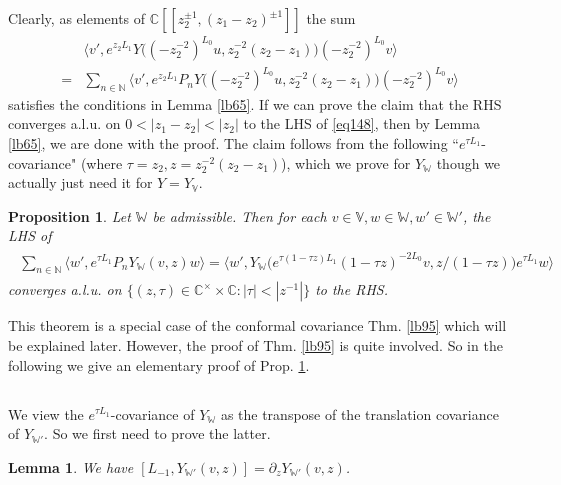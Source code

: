 \documentclass[11pt,b5paper,notitlepage]{article}
\theoremstyle{definition}
\theoremstyle{plain}
\newtheorem{pp}[df]{Proposition}
\newtheorem{lm}[df]{Lemma}
\newcommand{\bigbk}[1]{\big\langle {#1}\big\rangle}
\newcommand{\Vbb}{\mathbb V}
\newcommand{\Wbb}{\mathbb W}
\newcommand{\Cbb}{\mathbb C}
\newcommand{\Nbb}{\mathbb N}
\numberwithin{equation}{section}
\begin{document}
Clearly, as elements of $\Cbb[[z_2^{\pm1},(z_1-z_2)^{\pm1}]]$ the sum
\begin{align}
&\bigbk{v',e^{z_2L_1}Y\big((-z_2^{-2})^{L_0}u,z_2^{-2}(z_2-z_1)\big)(-z_2^{-2})^{L_0}v}\nonumber\\
=&\sum_{n\in\Nbb}\bigbk{v',e^{z_2L_1}P_nY\big((-z_2^{-2})^{L_0}u,z_2^{-2}(z_2-z_1)\big)(-z_2^{-2})^{L_0}v}	\label{eq147}
\end{align}
satisfies the conditions in Lemma \ref{lb65}. If we can prove the claim that the RHS converges a.l.u. on $0<|z_1-z_2|<|z_2|$ to the LHS of \eqref{eq148},
then by Lemma \ref{lb65}, we are done with the proof. The claim follows from the following ``$e^{\tau L_1}$-covariance" (where $\tau=z_2,z=z_2^{-2}(z_2-z_1)$), which we prove for $Y_\Wbb$ though we actually just need it for $Y=Y_\Vbb$.


\begin{pp}\label{lb90}
Let $\Wbb$ be admissible. Then for each $v\in\Vbb,w\in\Wbb,w'\in\Wbb'$, the LHS of
\begin{align}\label{eq151}
\begin{aligned}
\sum_{n\in\Nbb}\bigbk{w',e^{\tau L_1}P_nY_\Wbb(v,z)w}=\bigbk{w',Y_\Wbb\big(e^{\tau(1-\tau z)L_1}(1-\tau z)^{-2L_0}v,z/(1-\tau z)\big)e^{\tau L_1}w}
\end{aligned}	
\end{align}
converges a.l.u. on $\{(z,\tau)\in\Cbb^\times\times\Cbb:|\tau|<|z^{-1}|\}$ to the RHS.
\end{pp}


This theorem is a special case of the conformal covariance Thm. \ref{lb95} which will be explained later. However, the proof of Thm. \ref{lb95} is quite involved. So in the following we give an elementary proof of Prop. \ref{lb90}.






\subsection{}


We view the $e^{\tau L_1}$-covariance of $Y_\Wbb$ as the transpose of the translation covariance of $Y_{\Wbb'}$. So we first need to prove the latter.


\begin{lm}
We have $[L_{-1},Y_{\Wbb'}(v,z)]=\partial_zY_{\Wbb'}(v,z)$.\label{eq136}
\end{lm}
\end{document}
